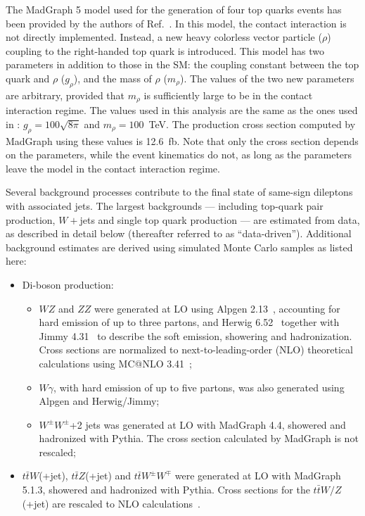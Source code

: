 The {\sc MadGraph} 5 model used for the generation of four top quarks events has been provided by 
the authors of Ref.~\cite{Degrande:2010kt}. In this model, the contact interaction is not directly implemented. 
Instead, a new heavy colorless vector particle ($\rho$) coupling to the right-handed top quark is introduced. 
This model has two parameters in addition to those in the SM: the coupling constant between 
the top quark and $\rho$ ($g_\rho$), and the mass of $\rho$ ($m_\rho$). The values of the two new
parameters are arbitrary, provided that $m_\rho$ is sufficiently large to be in the contact interaction 
regime. The values used in this analysis are the same as the ones used in \cite{Degrande:2010kt}: 
$g_\rho=100\sqrt{8\pi}$ and $m_\rho=100$~TeV. The production cross section computed by {\sc MadGraph} 
using these values is 12.6~fb. Note that only the cross section depends on the parameters, while
the event kinematics do not, as long as the parameters leave the model in the contact interaction regime.

Several background processes contribute to the final state of same-sign dileptons with associated jets.
The largest backgrounds --- including top-quark pair production, $W+$jets and single top quark production ---
are estimated from data, as described in detail below (thereafter referred to as ``data-driven''). Additional
background estimates are derived using simulated Monte Carlo samples as listed here:
\begin{itemize}
\item Di-boson production:
  \begin{itemize}
  \item $WZ$ and $ZZ$ were generated at LO using {\sc Alpgen} 2.13~\cite{Mangano:2002ea}, accounting for 
    hard emission of up to three partons, and {\sc Herwig} 6.52~\cite{COR-0001} together with
    {\sc Jimmy} 4.31~\cite{JButterworth:1996zw} to describe the 
    soft emission, showering and hadronization. Cross sections are 
    normalized to next-to-leading-order (NLO) theoretical calculations using 
    {\sc MC@NLO} 3.41~\cite{Frixione:2002ik};
  \item $W\gamma$, with hard emission of up to five partons, was also generated using {\sc Alpgen} and 
    {\sc Herwig/Jimmy};
  \item $W^{\pm}W^{\pm}$+2 jets was generated at LO with {\sc MadGraph} 4.4, 
    showered and hadronized with
    {\sc Pythia}. The cross section calculated by {\sc MadGraph} is not rescaled;
  \end{itemize} 
\item $t\bar{t}W$(+jet), $t\bar{t}Z$(+jet) and $t\bar{t}W^{\pm}W^{\mp}$ were generated at LO with
  {\sc MadGraph} 5.1.3, 
  showered and hadronized with {\sc Pythia}. Cross sections for the $t\bar{t}W/Z$(+jet)
  are rescaled to NLO calculations~\cite{Campbell:2012dh,Garzelli:2011is}.
\end{itemize}

